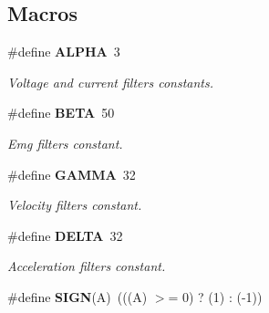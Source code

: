 \subsection*{Macros}
\begin{DoxyCompactItemize}
\item 
\mbox{\label{utils_8h_af5abd28c44c29b7397c84f1fec4b1d84}} 
\#define \textbf{ A\+L\+P\+HA}~3
\begin{DoxyCompactList}\small\item\em Voltage and current filters constants. \end{DoxyCompactList}\item 
\mbox{\label{utils_8h_a1b996515309fc3c03449912bb33046e3}} 
\#define \textbf{ B\+E\+TA}~50
\begin{DoxyCompactList}\small\item\em Emg filters constant. \end{DoxyCompactList}\item 
\mbox{\label{utils_8h_a8659b9de3e544ff142b153b076f30fd5}} 
\#define \textbf{ G\+A\+M\+MA}~32
\begin{DoxyCompactList}\small\item\em Velocity filters constant. \end{DoxyCompactList}\item 
\mbox{\label{utils_8h_a3fd2b1bcd7ddcf506237987ad780f495}} 
\#define \textbf{ D\+E\+L\+TA}~32
\begin{DoxyCompactList}\small\item\em Acceleration filters constant. \end{DoxyCompactList}\item 
\mbox{\label{utils_8h_a8c7db0cde6d591a5abad279ba92ef021}} 
\#define {\bfseries S\+I\+GN}(A)~(((A) $>$= 0) ? (1) \+: (-\/1))
\end{DoxyCompactItemize}

